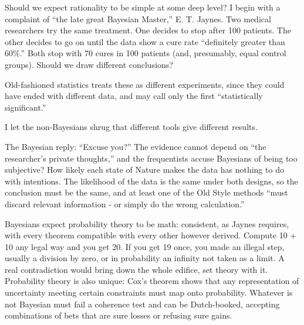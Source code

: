 
Should we expect rationality to be simple at some deep level? I begin with a complaint of ``the late great Bayesian Master,'' E. T. Jaynes. Two medical researchers try the same treatment. One decides to stop after 100 patients. The other decides to go on until the data show a cure rate ``definitely greater than 60\%.'' Both stop with 70 cures in 100 patients (and, presumably, equal control groups). Should we draw different conclusions?

Old-fashioned statistics treats these as different experiments, since they could have ended with different data, and may call only the first ``statistically significant.'' 

I let the non-Bayesians shrug that different tools give different results. 

The Bayesian reply: ``Excuse you?'' The evidence cannot depend on ``the researcher's private thoughts,'' and the frequentists accuse Bayesians of being too subjective? How likely each state of Nature makes the data has nothing to do with intentions. The likelihood of the data is the same under both designs, so the conclusion must be the same, and at least one of the Old Style methods ``must discard relevant information - or simply do the wrong calculation.'' 

Bayesians expect probability theory to be math: consistent, as Jaynes requires, with every theorem compatible with every other however derived. Compute 10 + 10 any legal way and you get 20. If you get 19 once, you made an illegal step, usually a division by zero, or in probability an infinity not taken as a limit. A real contradiction would bring down the whole edifice, set theory with it. Probability theory is also unique: Cox's theorem shows that any representation of uncertainty meeting certain constraints must map onto probability. Whatever is not Bayesian must fail a coherence test and can be Dutch-booked, accepting combinations of bets that are sure losses or refusing sure gains. 

